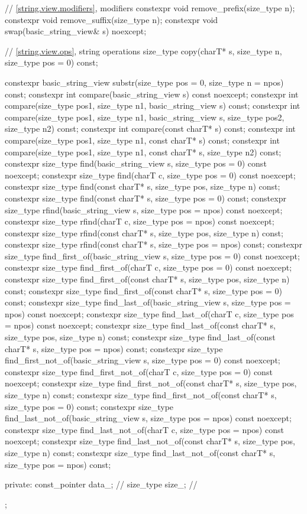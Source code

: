\begin{codeblock}
{  // \ref{string.view.modifiers}, modifiers
  constexpr void remove_prefix(size_type n);
  constexpr void remove_suffix(size_type n);
  constexpr void swap(basic_string_view& s) noexcept;

  // \ref{string.view.ops}, string operations
  size_type copy(charT* s, size_type n, size_type pos = 0) const;

  constexpr basic_string_view substr(size_type pos = 0, size_type n = npos) const;
  constexpr int compare(basic_string_view s) const noexcept;
  constexpr int compare(size_type pos1, size_type n1, basic_string_view s) const;
  constexpr int compare(size_type pos1, size_type n1, basic_string_view s,
                        size_type pos2, size_type n2) const;
  constexpr int compare(const charT* s) const;
  constexpr int compare(size_type pos1, size_type n1, const charT* s) const;
  constexpr int compare(size_type pos1, size_type n1, const charT* s,
                        size_type n2) const;
  constexpr size_type find(basic_string_view s, size_type pos = 0) const noexcept;
  constexpr size_type find(charT c, size_type pos = 0) const noexcept;
  constexpr size_type find(const charT* s, size_type pos, size_type n) const;
  constexpr size_type find(const charT* s, size_type pos = 0) const;
  constexpr size_type rfind(basic_string_view s, size_type pos = npos) const noexcept;
  constexpr size_type rfind(charT c, size_type pos = npos) const noexcept;
  constexpr size_type rfind(const charT* s, size_type pos, size_type n) const;
  constexpr size_type rfind(const charT* s, size_type pos = npos) const;
  constexpr size_type find_first_of(basic_string_view s, size_type pos = 0) const noexcept;
  constexpr size_type find_first_of(charT c, size_type pos = 0) const noexcept;
  constexpr size_type find_first_of(const charT* s, size_type pos, size_type n) const;
  constexpr size_type find_first_of(const charT* s, size_type pos = 0) const;
  constexpr size_type find_last_of(basic_string_view s, size_type pos = npos) const noexcept;
  constexpr size_type find_last_of(charT c, size_type pos = npos) const noexcept;
  constexpr size_type find_last_of(const charT* s, size_type pos, size_type n) const;
  constexpr size_type find_last_of(const charT* s, size_type pos = npos) const;
  constexpr size_type find_first_not_of(basic_string_view s, size_type pos = 0) const noexcept;
  constexpr size_type find_first_not_of(charT c, size_type pos = 0) const noexcept;
  constexpr size_type find_first_not_of(const charT* s, size_type pos,
                                        size_type n) const;
  constexpr size_type find_first_not_of(const charT* s, size_type pos = 0) const;
  constexpr size_type find_last_not_of(basic_string_view s,
                                       size_type pos = npos) const noexcept;
  constexpr size_type find_last_not_of(charT c, size_type pos = npos) const noexcept;
  constexpr size_type find_last_not_of(const charT* s, size_type pos,
                                       size_type n) const;
  constexpr size_type find_last_not_of(const charT* s, size_type pos = npos) const;

private:
  const_pointer data_; // \expos
  size_type size_;     // \expos
};
\end{codeblock}

